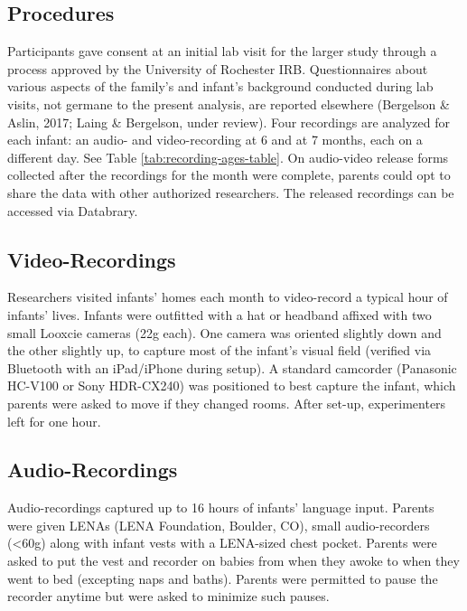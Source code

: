 \documentclass[man]{apa6}
\theoremstyle{definition}
\theoremstyle{definition}
\theoremstyle{definition}
\theoremstyle{remark}
\begin{document}
\subsection{Procedures}\label{procedures}

Participants gave consent at an initial lab visit for the larger study
through a process approved by the University of Rochester IRB.
Questionnaires about various aspects of the family's and infant's
background conducted during lab visits, not germane to the present
analysis, are reported elsewhere (Bergelson \& Aslin, 2017; Laing \&
Bergelson, under review). Four recordings are analyzed for each infant:
an audio- and video-recording at 6 and at 7 months, each on a different
day. See Table \ref{tab:recording-ages-table}. On audio-video release
forms collected after the recordings for the month were complete,
parents could opt to share the data with other authorized researchers.
The released recordings can be accessed via Databrary.

\subsection{Video-Recordings}\label{video-recordings}

Researchers visited infants' homes each month to video-record a typical
hour of infants' lives. Infants were outfitted with a hat or headband
affixed with two small Looxcie cameras (22g each). One camera was
oriented slightly down and the other slightly up, to capture most of the
infant's visual field (verified via Bluetooth with an iPad/iPhone during
setup). A standard camcorder (Panasonic HC-V100 or Sony HDR-CX240) was
positioned to best capture the infant, which parents were asked to move
if they changed rooms. After set-up, experimenters left for one hour.

\subsection{Audio-Recordings}\label{audio-recordings}

Audio-recordings captured up to 16 hours of infants' language input.
Parents were given LENAs (LENA Foundation, Boulder, CO), small
audio-recorders (\textless{}60g) along with infant vests with a
LENA-sized chest pocket. Parents were asked to put the vest and recorder
on babies from when they awoke to when they went to bed (excepting naps
and baths). Parents were permitted to pause the recorder anytime but
were asked to minimize such pauses.
\end{document}
